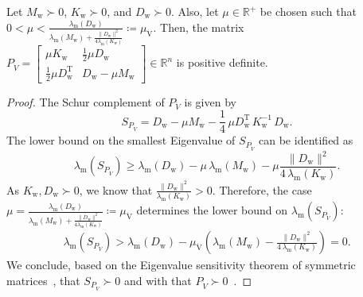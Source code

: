 \begin{lemma}\label{lemma:con:P_V_d_positive_definite}
    Let $M_\mathrm{w} \succ 0$, $K_\mathrm{w} \succ 0$, and $D_\mathrm{w} \succ 0$. Also, let $\mu \in \mathbb{R}^+$ be chosen such that $0 < \mu < \frac{\lambda_\mathrm{m}(D_\mathrm{w})}{\lambda_\mathrm{m}(M_\mathrm{w}) + \frac{\lVert D_\mathrm{w} \rVert^2}{4 \lambda_\mathrm{m} (K_\mathrm{w})}} \coloneqq \mu_{\dot{\mathrm{V}}}$.
    Then, the matrix $P_{\dot{V}} = \begin{bmatrix}
        \mu K_\mathrm{w} & \frac{1}{2} \mu D_\mathrm{w}\\
        \frac{1}{2} \mu D_\mathrm{w}^\mathrm{T} & D_\mathrm{w} - \mu M_\mathrm{w}
    \end{bmatrix} \in \mathbb{R}^{n}$ is positive definite.
\end{lemma}
\begin{proof}
    The Schur complement of $P_{\dot{V}}$ is given by
    \begin{equation}
        S_{P_{\dot{V}}} = D_\mathrm{w} - \mu M_\mathrm{w} - \frac{1}{4} \, \mu D_\mathrm{w}^\mathrm{T} \, K_\mathrm{w}^{-1} \, D_\mathrm{w}.
    \end{equation}
    The lower bound on the smallest Eigenvalue of $S_{P_{\dot{V}}}$ can be identified as
    \begin{equation}
        \lambda_\mathrm{m} \left (S_{P_{\dot{V}}} \right ) \geq \lambda_\mathrm{m}(D_\mathrm{w}) - \mu \, \lambda_\mathrm{m}(M_\mathrm{w}) - \mu \frac{\lVert D_\mathrm{w} \rVert^2}{4 \, \lambda_\mathrm{m}(K_\mathrm{w})}.
    \end{equation}
    As $K_\mathrm{w}, D_\mathrm{w} \succ 0$, we know that $\frac{\lVert D_\mathrm{w} \rVert^2}{\lambda_\mathrm{m}(K_\mathrm{w})} > 0$. Therefore, the case $\mu = \frac{\lambda_\mathrm{m}(D_\mathrm{w})}{\lambda_\mathrm{m}(M_\mathrm{w}) + \frac{\lVert D_\mathrm{w} \rVert^2}{4 \lambda_\mathrm{m} (K_\mathrm{w})}} \coloneqq \mu_{\dot{\mathrm{V}}}$ determines the lower bound on $\lambda_\mathrm{m}(S_{P_{\dot{V}}})$:
    \begin{equation}
    \begin{split}
        \lambda_\mathrm{m} \left (S_{P_{\dot{V}}} \right ) > \lambda_\mathrm{m}(D_\mathrm{w}) - \mu_{\dot{\mathrm{V}}} \left ( \lambda_\mathrm{m}(M_\mathrm{w}) - \frac{\lVert D_\mathrm{w} \rVert^2}{4 \, \lambda_\mathrm{m}(K_\mathrm{w})} \right ) = 0.
    \end{split}
    \end{equation}
    We conclude, based on the Eigenvalue sensitivity theorem of symmetric matrices~\citep{golub2013matrix}, that $S_{P_{\dot{V}}} \succ 0$ and with that $P_{\dot{V}} \succ 0$~\citep{boyd2004convex}.
\end{proof}

